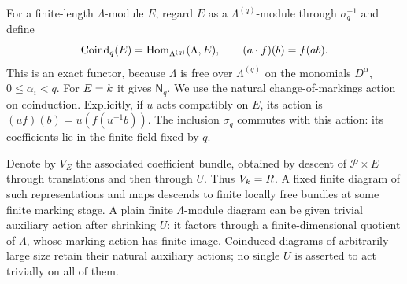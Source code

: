 For a finite-length $\Lambda$-module $E$, regard $E$ as a
$\Lambda^{(q)}$-module through $\sigma_q^{-1}$ and define
\[
 \operatorname{Coind}_q(E)=\operatorname{Hom}_{\Lambda^{(q)}}(\Lambda,E),
 \qquad (a\cdot f)(b)=f(ab).
\]
This is an exact functor, because $\Lambda$ is free over
$\Lambda^{(q)}$ on the monomials $D^\alpha$, $0\leq\alpha_i<q$.
For $E=k$ it gives $\mathsf N_q$.  We use the natural change-of-markings
action on coinduction.  Explicitly, if $u$ acts compatibly on $E$, its
action is $(u f)(b)=u(f(u^{-1}b))$.  The inclusion $\sigma_q$ commutes
with this action: its coefficients lie in the finite field fixed by $q$.

Denote by $V_E$ the associated coefficient bundle, obtained by descent
of $\mathscr P\times E$ through translations and then through $U$.
Thus $V_k=R$.  A fixed finite diagram of such representations and maps
descends to finite locally free bundles at some finite marking stage.
A plain finite $\Lambda$-module diagram can be given trivial auxiliary
action after shrinking $U$: it factors through a finite-dimensional
quotient of $\Lambda$, whose marking action has finite image.
Coinduced diagrams of arbitrarily large size retain their natural
auxiliary actions; no single $U$ is asserted to act trivially on all of
them.


